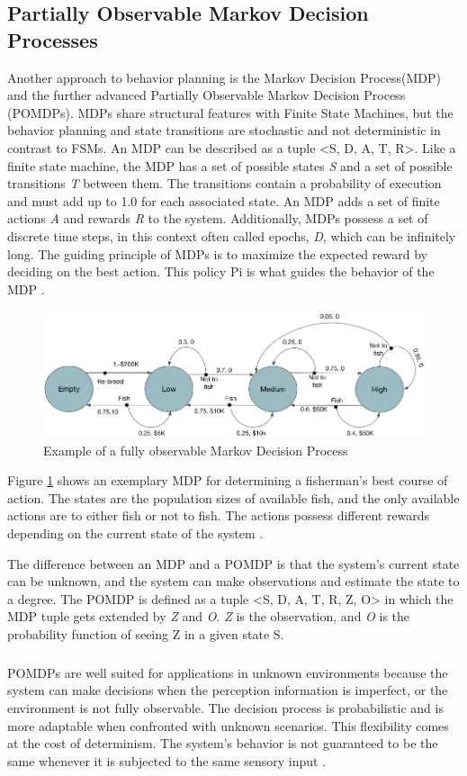 \subsection{Partially Observable Markov Decision Processes}
Another approach to behavior planning is the Markov Decision Process(MDP) and the further advanced Partially Observable Markov Decision Process (POMDPs). MDPs share structural features with Finite State Machines, but the behavior planning and state transitions are stochastic and not deterministic in contrast to FSMs. An MDP can be described as a tuple <S, D, A, T, R>. Like a finite state machine, the MDP has a set of possible states \textit{S} and a set of possible transitions \textit{T} between them. The transitions contain a probability of execution and must add up to 1.0 for each associated state. An MDP adds a set of finite actions \textit{A} and rewards \textit{R} to the system. Additionally, MDPs possess a set of discrete time steps, in this context often called epochs, \textit{D}, which can be infinitely long. The guiding principle of MDPs is to maximize the expected reward by deciding on the best action. This policy Pi is what guides the behavior of the MDP \cite{feyzabadi2014riskaware}.

\begin{figure}[ht]
	\includegraphics[width=1.0\textwidth]{images/mdp.png} 
	\caption{Example of a fully observable Markov Decision Process \cite{andrew1999reinforcement}}
	\label{fig:mdp}
\end{figure}

Figure \ref{fig:mdp} shows an exemplary MDP for determining a fisherman's best course of action. The states are the population sizes of available fish, and the only available actions are to either fish or not to fish. The actions possess different rewards depending on the current state of the system \cite{tanwar2019markov}. 

The difference between an MDP and a POMDP is that the system's current state can be unknown, and the system can make observations and estimate the state to a degree. The POMDP is defined as a tuple <S, D, A, T, R, Z, O> in which the MDP tuple gets extended by \textit{Z} and \textit{O}. \textit{Z} is the observation, and \textit{O} is the probability function of seeing Z in a given state S.
\subparagraph*{}
POMDPs are well suited for applications in unknown environments because the system can make decisions when the perception information is imperfect, or the environment is not fully observable. The decision process is probabilistic and is more adaptable when confronted with unknown scenarios. This flexibility comes at the cost of determinism. The system's behavior is not guaranteed to be the same whenever it is subjected to the same sensory input \cite{krishnamurthy2016partially}.




